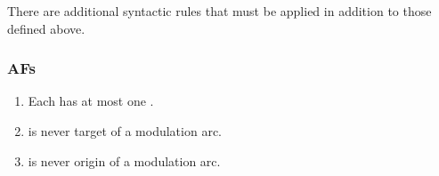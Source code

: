 There are additional syntactic rules that must be applied in addition to those defined above.

\subsubsection{AFs}

 \begin{enumerate}
    \item Each  has at most one .
    \item {} is never target of a modulation arc.
    \item {} is never origin of a modulation arc.
 \end{enumerate}



